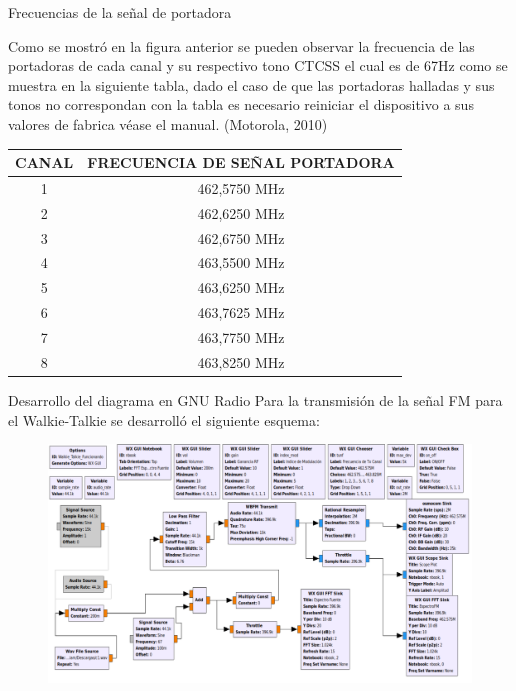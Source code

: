 \begin{frame}{Frecuencias de la señal de portadora}

Como se mostró en la figura anterior se pueden observar la frecuencia de las portadoras de cada canal y su respectivo tono CTCSS el cual es de 67Hz como se muestra en la siguiente tabla, dado el caso de que las portadoras halladas y sus tonos no correspondan con la tabla es necesario reiniciar el dispositivo a sus valores de fabrica véase el manual. (Motorola, 2010) 


\begin{table}[]
\scriptsize
\centering
\begin{tabular}{|c|c|}
\hline

\rowcolor{BlueGreen!20}
\textbf{CANAL} & \textbf{FRECUENCIA DE SEÑAL PORTADORA} \\ \hline
1              & 462,5750 MHz                           \\ \hline
2              & 462,6250 MHz                           \\ \hline
3              & 462,6750 MHz                           \\ \hline
4              & 463,5500 MHz                           \\ \hline
5              & 463,6250 MHz                           \\ \hline
6              & 463,7625 MHz                           \\ \hline
7              & 463,7750 MHz                           \\ \hline
8              & 463,8250 MHz                           \\ \hline
\end{tabular}
\end{table}

\end{frame}

\begin{frame}{Desarrollo del diagrama en GNU Radio}
Para la transmisión de la señal FM para el Walkie-Talkie se desarrolló el siguiente esquema:

\begin{figure}[H]
\centering
\vspace{-1mm}
\includegraphics[width=\textwidth]{parte3/lab14/pdf/Lab14_2.pdf}
\end{figure}

\end{frame}


